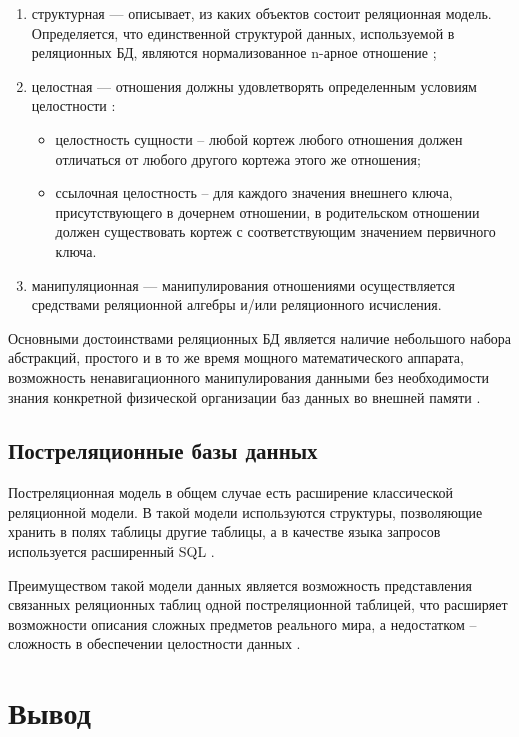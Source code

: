 \begin{enumerate}[label={\arabic*)}]
	\item структурная --- описывает, из каких объектов состоит реляционная модель. Определяется, что единственной структурой данных, используемой в реляционных БД, являются нормализованное n-арное отношение \cite{info_db_kuznecov};
	\item целостная --- отношения должны удовлетворять определенным условиям целостности \cite{info_lections_db}:
	\begin{itemize}[label*=--]
		\item целостность сущности -- любой кортеж любого отношения должен отличаться от любого другого кортежа этого же отношения;
		\item ссылочная целостность -- для каждого значения внешнего ключа, присутствующего в дочернем отношении, в родительском отношении должен существовать кортеж с соответствующим значением первичного ключа.
	\end{itemize}
	\item манипуляционная \cite{info_lections_db} --- манипулирования отношениями осуществляется средствами реляционной алгебры и/или реляционного исчисления.
\end{enumerate}

Основными достоинствами реляционных БД является наличие небольшого набора абстракций, простого и в то же время мощного математического аппарата, возможность ненавигационного манипулирования данными без необходимости знания конкретной физической организации баз данных во внешней памяти \cite{info_db_kuznecov}.

\subsection{Постреляционные базы данных}

Постреляционная модель в общем случае есть расширение классической реляционной модели. В такой модели используются структуры, позволяющие хранить в полях таблицы другие таблицы, а в качестве языка запросов используется расширенный SQL \cite{info_post_db}.

Преимуществом такой модели данных является возможность представления связанных реляционных таблиц одной постреляционной таблицей, что расширяет возможности описания сложных предметов реального мира, а недостатком -- сложность в обеспечении целостности данных \cite{info_db_sopchenko}.
                         
\section*{Вывод} 


